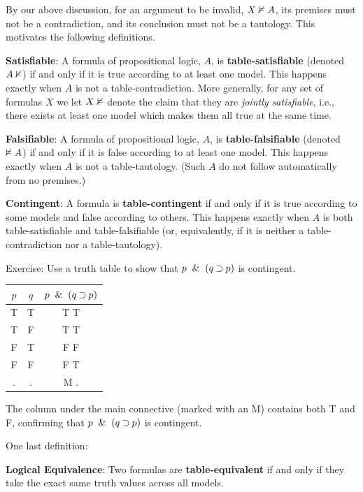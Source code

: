 \documentclass[options]{philosophersimprint}
\theoremstyle{definition}
\begin{document}
By our above discussion, for an argument to be invalid, $X \nvDash A$, its premises must not be a contradiction, and its conclusion must not be a tautology. This motivates the following definitions.

\textbf{Satisfiable}: A formula of propositional logic, $A$, is \textbf{table-satisfiable} (denoted $A\nvDash$) if and only if it is true according to at least one model. This happens exactly when $A$ is not a table-contradiction. More generally, for any set of formulas $X$ we let $X\nvDash$ denote the claim that they are \textit{jointly satisfiable}, i.e., there exists at least one model which makes them all true at the same time.

\textbf{Falsifiable}: A formula of propositional logic, $A$, is \textbf{table-falsifiable} (denoted $\nvDash A$) if and only if it is false according to at least one model. This happens exactly when $A$ is not a table-tautology. (Such $A$ do not follow automatically from no premises.)

\textbf{Contingent}: A formula is \textbf{table-contingent} if and only if it is true according to some models and false according to others. This happens exactly when $A$ is both table-satisfiable and table-falsifiable (or, equivalently, if it is neither a table-contradiction nor a table-tautology).

Exercise: Use a truth table to show that $p\ \mathbin{\&} \   (q \mathbin{\supset} p)$ is contingent.

\begin{table}[h!]
    \centering
    \begin{tabular}{c c | c}
        $p$ & $q$ & $p \ \mathbin{\&} \  (q \mathbin{\supset} p)$ \\
        \hline
        T & T & T \quad T \\
        T & F & T \quad T \\
        F & T & F \quad F \\
        F & F & F \quad T \\
        \hline
        $.$ & $.$ & M \quad $.$ \\
    \end{tabular}
\end{table}
The column under the main connective (marked with an M) contains both T and F, confirming that $p \ \mathbin{\&} \  (q \mathbin{\supset} p)$ is contingent.

One last definition:

\textbf{Logical Equivalence}: Two formulas are \textbf{table-equivalent} if and only if they take the exact same truth values across all models.
\end{document}
